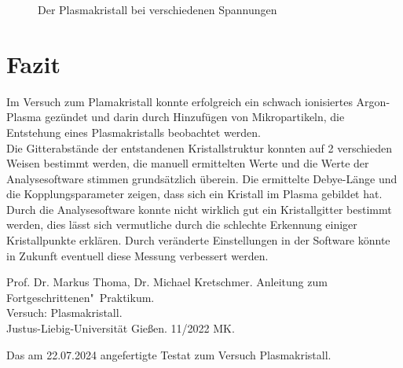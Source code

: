 \documentclass[12pt,a4paper,ngerman]{article}
\begin{document}
\begin{figure}
		\caption{Der Plasmakristall bei verschiedenen Spannungen}
		\label{fig:Spannungsaenderung}
	\end{figure}

\section*{Fazit}
	Im Versuch zum Plamakristall konnte erfolgreich ein schwach ionisiertes Argon-Plasma gezündet und darin durch Hinzufügen von Mikropartikeln, die Entstehung eines Plasmakristalls beobachtet werden.\\
	Die Gitterabstände der entstandenen Kristallstruktur konnten auf 2 verschieden Weisen bestimmt werden, die manuell ermittelten Werte und die Werte der Analysesoftware stimmen grundsätzlich überein. Die ermittelte Debye-Länge und die Kopplungsparameter zeigen, dass sich ein Kristall im Plasma gebildet hat.\\
	Durch die Analysesoftware konnte nicht wirklich gut ein Kristallgitter bestimmt werden, dies lässt sich vermutliche durch die schlechte Erkennung einiger Kristallpunkte erklären. Durch veränderte Einstellungen in der Software könnte in Zukunft eventuell diese Messung verbessert werden.

\newpage
 \begin{thebibliography}{111}%
	Prof. Dr. Markus Thoma, Dr. Michael Kretschmer. Anleitung zum Fortgeschrittenen"~Praktikum.\\ \glqq Versuch: Plasmakristall\grqq.\\ Justus-Liebig-Universität Gießen. 11/2022 MK.
	
 		Das am 22.07.2024 angefertigte Testat zum Versuch \glqq Plasmakristall\grqq.
 	\end{thebibliography}
\end{document}
